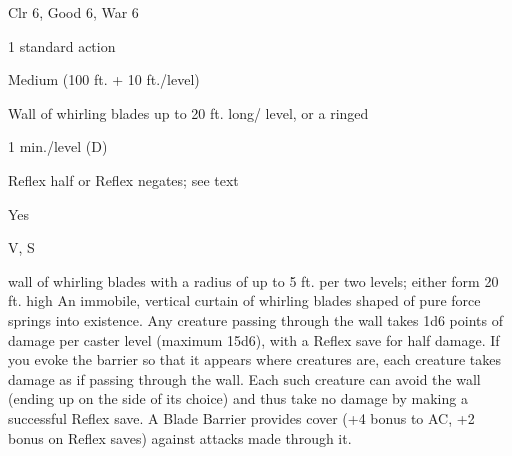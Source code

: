 
\begin{description*}
\item[Level:] Clr 6, Good 6, War 6
\item[Casting Time:] 1 standard action
\item[Range:] Medium (100 ft. + 10 ft./level)
\item[Effect:] Wall of whirling blades up to 20 ft. long/ level, or a ringed
\item[Duration:] 1 min./level (D)
\item[Saving Throw:] Reflex half or Reflex negates; see text
\item[Spell Resistance:] Yes
\item[Components:] V, S
\end{description*}

wall of whirling blades with a radius of up to 5 ft. per two levels; either form
20 ft. high
An immobile, vertical curtain of whirling blades shaped of pure force springs into
existence. Any creature passing through the wall takes 1d6 points of damage per
caster level (maximum 15d6), with a Reflex save for half damage.
If you evoke the barrier so that it appears where creatures are, each creature
takes damage as if passing through the wall. Each such creature can avoid the wall
(ending up on the side of its choice) and thus take no damage by making a successful
Reflex save.
A Blade Barrier provides cover (+4 bonus to AC, +2 bonus on Reflex saves)
against attacks made through it.